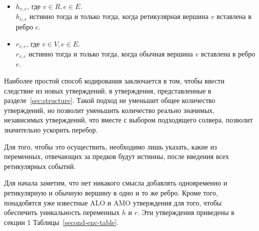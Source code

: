 \begin{itemize}
  \item $h_{v,e}$, где $v \in R, e \in E$. \\
  $h_{v,e}$ истинно тогда и только тогда, когда ретикулярная вершина $v$ вставлена в ребро $e$.
  \item $r_{v,e}$, где $v \in V, e \in E$. \\
  $r_{v,e}$ истинно тогда и только тогда, когда обычная вершина $v$ вставлена в ребро $e$.
\end{itemize}

Наиболее простой способ кодирования заключается в том, чтобы ввести следствие из новых утверждений, в утверждения, представленные в разделе~\ref{sec:structure}.
Такой подход не уменьшит общее количество утверждений, но позволит уменьшить количество реально значимых, независимых утверждений, что вместе с выбором подходящего солвера, позволит значительно ускорить перебор.

Для того, чтобы это осуществить, необходимо лишь указать, какие из переменных, отвечающих за предков будут истинны, после введения всех ретикулярных событий.

Для начала заметим, что нет никакого смысла добавлять одновременно и ретикулярную и обычную вершину в одно и то же ребро.
Кроме того, понадобятся уже известные ALO и AMO утверждения для того, чтобы обеспечить уникальность переменных $h$ и $r$.
Эти утверждения приведены в секции 1 Таблицы~\ref{second-enc-table}.

